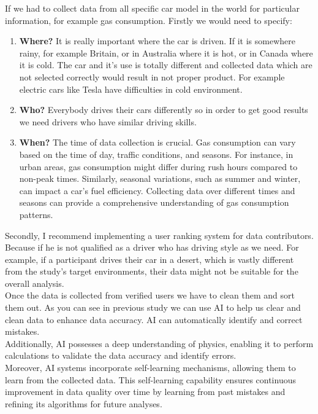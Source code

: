 \documentclass[10pt,a4paper]{article}
\begin{document}
If we had to collect data from all specific car model in the world for particular information, for example gas consumption.
Firstly we would need to specify:

\begin{enumerate}
    \item \textbf{Where?} It is really important where the car is driven. If it is somewhere rainy, for example Britain, or in Australia where it is hot, or in Canada where it is cold. The car and it's use is totally different and collected data which are not selected correctly would result in not proper product. For example electric cars like Tesla have difficulties in cold environment.
    \item \textbf{Who?} Everybody drives their cars differently so in order to get good results we need drivers who have similar driving skills.
    \item \textbf{When?} The time of data collection is crucial. Gas consumption can vary based on the time of day, traffic conditions, and seasons. For instance, in urban areas, gas consumption might differ during rush hours compared to non-peak times. Similarly, seasonal variations, such as summer and winter, can impact a car's fuel efficiency. Collecting data over different times and seasons can provide a comprehensive understanding of gas consumption patterns.
\end{enumerate}

Secondly, I recommend implementing a user ranking system for data contributors. Because if he is not qualified as a driver who has driving style as we need. For example, if a participant drives their car in a desert, which is vastly different from the study's target environments, their data might not be suitable for the overall analysis.\cite{8605945}
\\Once the data is collected from verified users we have to clean them and sort them out.
As you can see in previous study we can use AI to help us clear and clean data to enhance data accuracy. AI can automatically identify and correct mistakes. \\Additionally, AI possesses a deep understanding of physics, enabling it to perform calculations to validate the data accuracy and identify errors. \\Moreover, AI systems incorporate self-learning mechanisms, allowing them to learn from the collected data. This self-learning capability ensures continuous improvement in data quality over time by learning from past mistakes and refining its algorithms for future analyses.\cite{6949519}
\end{document}

